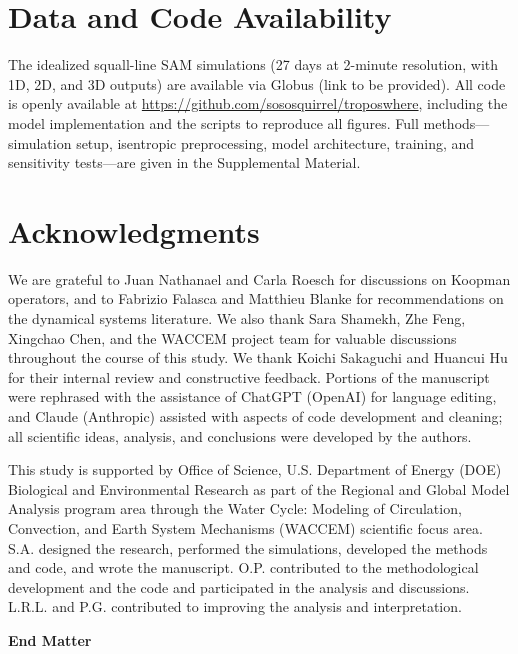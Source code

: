 \documentclass[
    aps,
    prl,
    reprint,
    superscriptaddress,
    amsmath,amssymb,
    floatfix,
    nofootinbib
]{revtex4-2}
\begin{document}
\section*{Data and Code Availability}

The idealized squall-line SAM simulations (27 days at 2-minute resolution, with 1D, 2D, and 3D outputs) are available via Globus (link to be provided). All code is openly available at \url{https://github.com/sososquirrel/troposwhere}, including the model implementation and the scripts to reproduce all figures. Full methods---simulation setup, isentropic preprocessing, model architecture, training, and sensitivity tests---are given in the Supplemental Material.

\section*{Acknowledgments}

We are grateful to Juan Nathanael and Carla Roesch for discussions on Koopman operators, and to Fabrizio Falasca and Matthieu Blanke for recommendations on the dynamical systems literature. We also thank Sara Shamekh, Zhe Feng, Xingchao Chen, and the WACCEM project team for valuable discussions throughout the course of this study. We thank Koichi Sakaguchi and Huancui Hu for their internal review and constructive feedback. Portions of the manuscript were rephrased with the assistance of ChatGPT (OpenAI) for language editing, and Claude (Anthropic) assisted with aspects of code development and cleaning; all scientific ideas, analysis, and conclusions were developed by the authors. 

This study is supported by Office of Science, U.S. Department of Energy (DOE) Biological and Environmental Research as part of the Regional and Global Model Analysis program area through the Water Cycle: Modeling of Circulation, Convection, and Earth System Mechanisms (WACCEM) scientific focus area. S.A. designed the research, performed the simulations, developed the methods and code, and wrote the manuscript. O.P. contributed to the methodological development and the code and participated in the analysis and discussions. L.R.L. and P.G. contributed to improving the analysis and interpretation.



\clearpage
\onecolumngrid
\vspace{1.5em}
\begin{center}{\large\textbf{End Matter}}\end{center}
\vspace{0.5em}
\twocolumngrid
\setcounter{figure}{0}
\setcounter{equation}{0}
\renewcommand{\thefigure}{EM\arabic{figure}}
\renewcommand{\theequation}{EM\arabic{equation}}
\renewcommand{\theHfigure}{EM.\arabic{figure}}
\renewcommand{\theHequation}{EM.\arabic{equation}}
\end{document}
